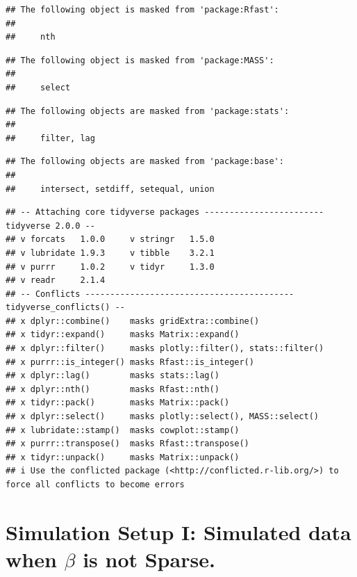 \documentclass[
]{article}
\begin{document}
\begin{verbatim}
## The following object is masked from 'package:Rfast':
## 
##     nth
\end{verbatim}

\begin{verbatim}
## The following object is masked from 'package:MASS':
## 
##     select
\end{verbatim}

\begin{verbatim}
## The following objects are masked from 'package:stats':
## 
##     filter, lag
\end{verbatim}

\begin{verbatim}
## The following objects are masked from 'package:base':
## 
##     intersect, setdiff, setequal, union
\end{verbatim}

\begin{verbatim}
## -- Attaching core tidyverse packages ------------------------ tidyverse 2.0.0 --
## v forcats   1.0.0     v stringr   1.5.0
## v lubridate 1.9.3     v tibble    3.2.1
## v purrr     1.0.2     v tidyr     1.3.0
## v readr     2.1.4     
## -- Conflicts ------------------------------------------ tidyverse_conflicts() --
## x dplyr::combine()    masks gridExtra::combine()
## x tidyr::expand()     masks Matrix::expand()
## x dplyr::filter()     masks plotly::filter(), stats::filter()
## x purrr::is_integer() masks Rfast::is_integer()
## x dplyr::lag()        masks stats::lag()
## x dplyr::nth()        masks Rfast::nth()
## x tidyr::pack()       masks Matrix::pack()
## x dplyr::select()     masks plotly::select(), MASS::select()
## x lubridate::stamp()  masks cowplot::stamp()
## x purrr::transpose()  masks Rfast::transpose()
## x tidyr::unpack()     masks Matrix::unpack()
## i Use the conflicted package (<http://conflicted.r-lib.org/>) to force all conflicts to become errors
\end{verbatim}

\hypertarget{simulation-setup-i-simulated-data-when-beta-is-not-sparse.}{%
\section{\texorpdfstring{Simulation Setup I: Simulated data when
\(\beta\) is not
Sparse.}{Simulation Setup I: Simulated data when \textbackslash beta is not Sparse.}}\label{simulation-setup-i-simulated-data-when-beta-is-not-sparse.}}
\end{document}
